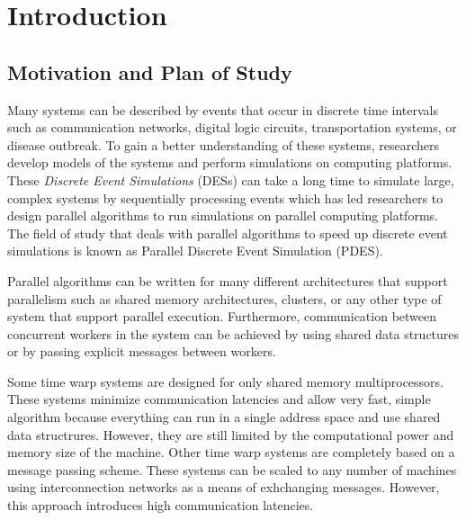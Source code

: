 \documentclass[11pt]{book}
\begin{document}
\tableofcontents \markright{ }
\listoffigures \markright{ }
\listoftables \markright{ }
\listofalgorithms \markright { }
\lstlistoflistings \markright{ }

\clearpage
{} \setcounter{page}{1}

\chapter{Introduction}\label{intro}

\section{Motivation and Plan of Study}

Many systems can be described by events that occur in discrete time intervals such as
communication networks, digital logic circuits, transportation systems, or disease
outbreak. To gain a better understanding of these systems, researchers develop models of
the systems and perform simulations on computing platforms. These \emph{Discrete Event
Simulations} (DESs) can take a long time to simulate large, complex systems by sequentially
processing events which has led researchers to design parallel algorithms to run simulations
on parallel computing platforms. The field of study that deals with parallel algorithms
to speed up discrete event simulations is known as Parallel Discrete Event Simulation (PDES).

Parallel algorithms can be written for many different architectures that support parallelism
such as shared memory architectures, clusters, or any other type of system that support
parallel execution. Furthermore, communication between concurrent workers in the system can
be achieved by using shared data structures or by passing explicit messages between workers.

Some time warp systems are designed for only shared memory multiprocessors. These systems
minimize communication latencies and allow very fast, simple algorithm because everything
can run in a single address space and use shared data structrures. However, they are still
limited by the computational power and memory size of the machine. Other time warp systems
are completely based on a message passing scheme. These systems can be scaled to any number
of machines using interconnection networks as a means of exhchanging messages. However,
this approach introduces high communication latencies.
\end{document}
